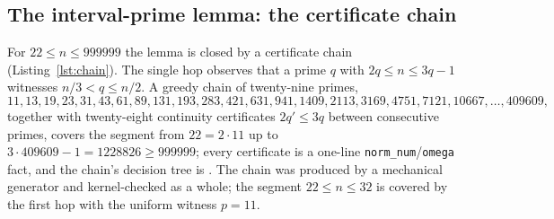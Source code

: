 \documentclass[11pt]{article}
\theoremstyle{definition}
\begin{document}
\subsection{The interval-prime lemma: the certificate chain}

For $22 \le n \le 999999$ the lemma is closed by a certificate chain
(Listing~\ref{lst:chain}). The single hop  observes that a
prime $q$ with $2q \le n \le 3q - 1$ witnesses $n/3 < q \le n/2$. A greedy
chain of twenty-nine primes,
\[
11, 13, 19, 23, 31, 43, 61, 89, 131, 193, 283, 421, 631, 941, 1409, 2113,
3169, 4751, 7121, 10667, \ldots, 409609,
\]
together with twenty-eight continuity certificates $2q' \le 3q$ between
consecutive primes, covers the segment from $22 = 2 \cdot 11$ up to
$3 \cdot 409609 - 1 = 1228826 \ge 999999$; every certificate is a one-line
\texttt{norm\_num}/\texttt{omega} fact, and the chain's decision tree is
. The chain was produced by a mechanical generator
and kernel-checked as a whole; the segment $22 \le n \le 32$ is covered by
the first hop with the uniform witness $p = 11$.
\end{document}
